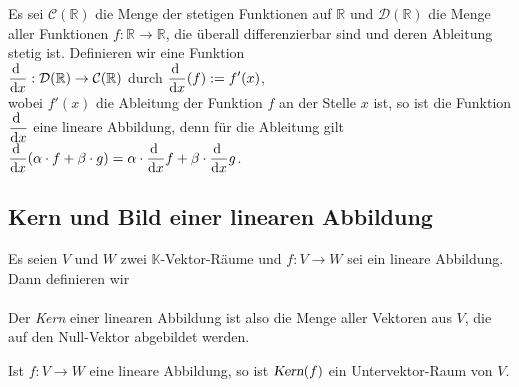 \example
Es sei $\mathcal{C}(\mathbb{R})$ die Menge der stetigen Funktionen auf $\mathbb{R}$ und $\mathcal{D}(\mathbb{R})$ die Menge aller Funktionen
$f:\mathbb{R} \rightarrow \mathbb{R}$, die \"{u}berall differenzierbar sind und deren Ableitung stetig ist.  Definieren wir eine Funktion
\\[0.2cm]
\hspace*{1.3cm}
$\displaystyle\frac{\mathrm{d}\;}{\mathrm{d}x}: \mathcal{D}(\mathbb{R}) \rightarrow \mathcal{C}(\mathbb{R})$ \quad durch $\displaystyle\frac{\mathrm{d}\;}{\mathrm{d}x}(f) := f'(x)$,
\\[0.2cm]
wobei $f'(x)$ die Ableitung der Funktion $f$ an der Stelle $x$ ist, so ist die Funktion $\displaystyle\frac{\mathrm{d}\;}{\mathrm{d}x}$ eine lineare Abbildung,
denn f\"{u}r die Ableitung gilt
\\[0.2cm]
\hspace*{1.3cm}
$\displaystyle\frac{\mathrm{d}\;}{\mathrm{d}x} (\alpha \cdot f + \beta \cdot g) = \alpha \cdot \frac{\mathrm{d}\;}{\mathrm{d}x} f + \beta \cdot \frac{\mathrm{d}\;}{\mathrm{d}x} g$. \eoxs


\subsection{Kern und Bild einer linearen Abbildung}
\begin{Definition}[Kern]
  Es seien $V$ und $W$ zwei $\mathbb{K}$-Vektor-R\"{a}ume und $f:V \rightarrow W$ sei ein lineare Abbildung.  Dann definieren wir 
  \\[0.2cm]
  \hspace*{1.3cm}
  \colorbox{red}{}
  \\[0.2cm] 
  Der \emph{\color{blue}Kern} einer linearen Abbildung ist also die Menge aller Vektoren aus $V$, die auf den Null-Vektor abgebildet werden.  \eoxs
\end{Definition}

\begin{Satz}
  Ist $f:V \rightarrow W$ eine lineare Abbildung, so ist $\textsl{Kern}(f)$ ein Untervektor-Raum von $V$.
\end{Satz}

